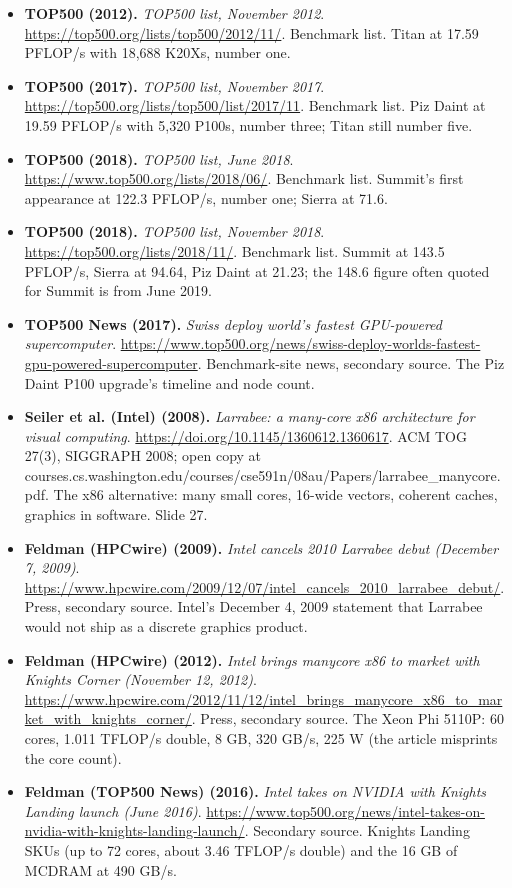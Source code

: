 \begin{itemize}[leftmargin=1.2em,itemsep=3pt]
\item \textbf{TOP500 (2012).} \textit{TOP500 list, November 2012}. \url{https://top500.org/lists/top500/2012/11/}. Benchmark list. Titan at 17.59 PFLOP/s with 18,688 K20Xs, number one.
\item \textbf{TOP500 (2017).} \textit{TOP500 list, November 2017}. \url{https://top500.org/lists/top500/list/2017/11}. Benchmark list. Piz Daint at 19.59 PFLOP/s with 5,320 P100s, number three; Titan still number five.
\item \textbf{TOP500 (2018).} \textit{TOP500 list, June 2018}. \url{https://www.top500.org/lists/2018/06/}. Benchmark list. Summit's first appearance at 122.3 PFLOP/s, number one; Sierra at 71.6.
\item \textbf{TOP500 (2018).} \textit{TOP500 list, November 2018}. \url{https://top500.org/lists/2018/11/}. Benchmark list. Summit at 143.5 PFLOP/s, Sierra at 94.64, Piz Daint at 21.23; the 148.6 figure often quoted for Summit is from June 2019.
\item \textbf{TOP500 News (2017).} \textit{Swiss deploy world's fastest GPU-powered supercomputer}. \url{https://www.top500.org/news/swiss-deploy-worlds-fastest-gpu-powered-supercomputer}. Benchmark-site news, secondary source. The Piz Daint P100 upgrade's timeline and node count.
\item \textbf{Seiler et al. (Intel) (2008).} \textit{Larrabee: a many-core x86 architecture for visual computing}. \url{https://doi.org/10.1145/1360612.1360617}. ACM TOG 27(3), SIGGRAPH 2008; open copy at courses.cs.washington.edu/courses/cse591n/08au/Papers/larrabee\_manycore.pdf. The x86 alternative: many small cores, 16-wide vectors, coherent caches, graphics in software. Slide 27.
\item \textbf{Feldman (HPCwire) (2009).} \textit{Intel cancels 2010 Larrabee debut (December 7, 2009)}. \url{https://www.hpcwire.com/2009/12/07/intel_cancels_2010_larrabee_debut/}. Press, secondary source. Intel's December 4, 2009 statement that Larrabee would not ship as a discrete graphics product.
\item \textbf{Feldman (HPCwire) (2012).} \textit{Intel brings manycore x86 to market with Knights Corner (November 12, 2012)}. \url{https://www.hpcwire.com/2012/11/12/intel_brings_manycore_x86_to_market_with_knights_corner/}. Press, secondary source. The Xeon Phi 5110P: 60 cores, 1.011 TFLOP/s double, 8 GB, 320 GB/s, 225 W (the article misprints the core count).
\item \textbf{Feldman (TOP500 News) (2016).} \textit{Intel takes on NVIDIA with Knights Landing launch (June 2016)}. \url{https://www.top500.org/news/intel-takes-on-nvidia-with-knights-landing-launch/}. Secondary source. Knights Landing SKUs (up to 72 cores, about 3.46 TFLOP/s double) and the 16 GB of MCDRAM at 490 GB/s.

\end{itemize}
